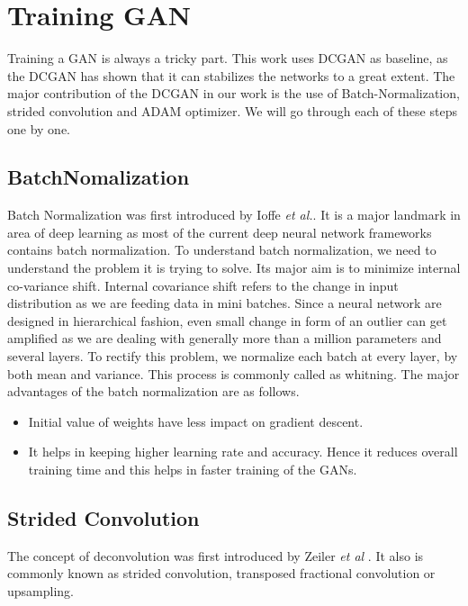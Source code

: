 \section{Training GAN}

Training a GAN is always a tricky part. This work uses DCGAN\cite{DCGAN} as baseline, as the DCGAN has shown that it can stabilizes the networks to a great extent. The major contribution of the DCGAN in our work is the use of Batch-Normalization, strided convolution and ADAM optimizer. We will go through each of these steps one by one.
\subsection{BatchNomalization}

Batch Normalization was first introduced by Ioffe \textit{et al.}\cite{BatchNorm}. It is a major landmark in area of deep learning as most of the current deep neural network frameworks contains batch normalization. 
To understand batch normalization, we need to understand the problem it is trying to solve. Its major aim is to minimize internal co-variance shift. Internal covariance shift refers to the change in input distribution as we are feeding data in mini batches. Since a neural network are designed in hierarchical fashion, even small change in form of an outlier can get amplified as we are dealing with generally more than a million parameters and several layers. To rectify this problem, we normalize each batch at every layer, by both mean and variance. This process is commonly called as whitning. The major advantages of the batch normalization are as follows.
\begin{itemize}
    \item Initial value of weights have less impact on gradient descent.
    \item It helps in keeping higher learning rate and accuracy. Hence it reduces overall training time and this helps in faster training of the GANs.
\end{itemize}

\subsection{Strided Convolution}

The concept of deconvolution was first introduced by Zeiler \textit{et al} \cite{Deconv}. It also is commonly known as  strided convolution, transposed fractional convolution or upsampling.



